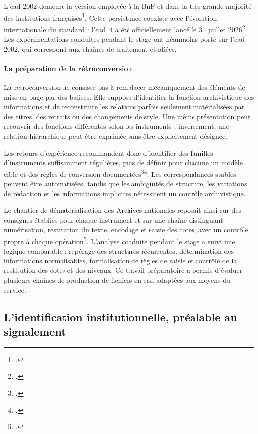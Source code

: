 L'\gls{ead} 2002 demeure la version employée à la BnF et dans la très grande majorité des institutions françaises\footcite{BnFEADGeneralites}. Cette persistance coexiste avec l'évolution internationale du standard : l'\gls{ead}~4 a été officiellement lancé le 31 juillet 2026\footcite{EAD4Release2026}. Les expérimentations conduites pendant le stage ont néanmoins porté sur l'\gls{ead} 2002, qui correspond aux chaînes de traitement étudiées.

\paragraph{La préparation de la rétroconversion}

La \gls{retroconversion} ne consiste pas à remplacer mécaniquement des éléments de mise en page par des balises. Elle suppose d'identifier la fonction archivistique des informations et de reconstruire les relations parfois seulement matérialisées par des titres, des retraits ou des changements de style. Une même présentation peut recouvrir des fonctions différentes selon les instruments ; inversement, une relation hiérarchique peut être exprimée sans être explicitement désignée.

Les retours d'expérience recommandent donc d'identifier des familles d'instruments suffisamment régulières, puis de définir pour chacune un modèle cible et des règles de conversion documentées\footcite{GouletMaftei2006}\footcite{Meissner1997}. Les correspondances stables peuvent être automatisées, tandis que les ambiguïtés de structure, les variations de rédaction et les informations implicites nécessitent un contrôle archivistique.

Le chantier de dématérialisation des Archives nationales reposait ainsi sur des consignes établies pour chaque instrument et sur une chaîne distinguant numérisation, restitution du texte, encodage et saisie des cotes, avec un contrôle propre à chaque opération\footcite[pp.~199--202]{Aristide2010}. L'analyse conduite pendant le stage a suivi une logique comparable : repérage des structures récurrentes, détermination des informations normalisables, formalisation de règles de saisie et contrôle de la restitution des cotes et des niveaux. Ce travail préparatoire a permis d'évaluer plusieurs chaînes de production de fichiers en \gls{ead} adaptées aux moyens du service.

\subsection{L'identification institutionnelle, préalable au signalement}
\label{subsec:identification-institutionnelle}

